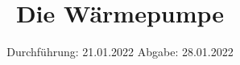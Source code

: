 

\subject{VERSUCH 206}
\title{Die Wärmepumpe}
\date{%
  Durchführung: 21.01.2022
  \hspace{3em}
  Abgabe: 28.01.2022
}



\maketitle
\thispagestyle{empty}
\tableofcontents
\newpage







\printbibliography{}



